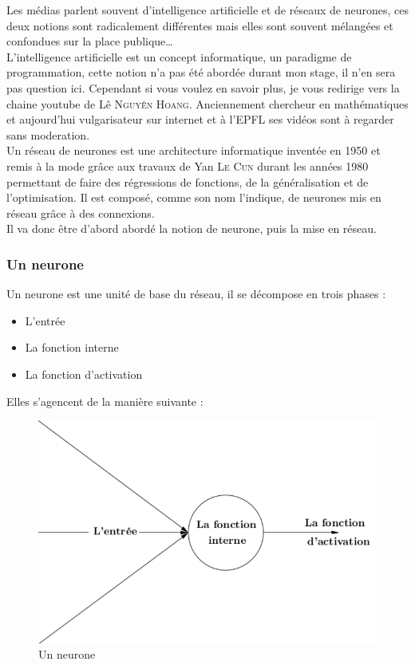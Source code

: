 
Les médias parlent souvent d'intelligence artificielle et de réseaux de neurones,
ces deux notions sont radicalement différentes
mais elles sont souvent mélangées et confondues sur la place publique\ldots \\


L'intelligence artificielle est un concept informatique, un paradigme de programmation,
cette notion n'a pas été abordée durant mon stage, il n'en sera pas question ici.
Cependant si vous voulez en savoir plus, je vous redirige vers la chaine youtube de Lê \textsc{Nguyên Hoang}.
Anciennement chercheur en mathématiques et aujourd'hui vulgarisateur sur internet et à l'\textsc{EPFL}
ses vidéos sont à regarder sans moderation\cite{science4all}. \\


Un réseau de neurones est une architecture informatique inventée en 1950 et remis à la mode grâce aux travaux
de Yan \textsc{Le Cun} durant les années 1980 permettant de faire des régressions de fonctions,
de la généralisation et de l'optimisation.
Il est composé, comme son nom l'indique, de neurones mis en réseau grâce à des connexions.\\
Il va donc être d'abord abordé la notion de neurone, puis la mise en réseau.


\subsubsection{Un neurone}
Un neurone est une unité de base du réseau, il se décompose en trois phases :
\begin{itemize}
    \item L'entrée
    \item La fonction interne
    \item La fonction d'activation
\end{itemize}
Elles s'agencent de la manière suivante :
\begin{figure}[H]
    \center
    \includegraphics[height=\moyen]{pict/neurone.png}
	\caption{Un neurone}
    \label{fig:neurone}
\end{figure}


